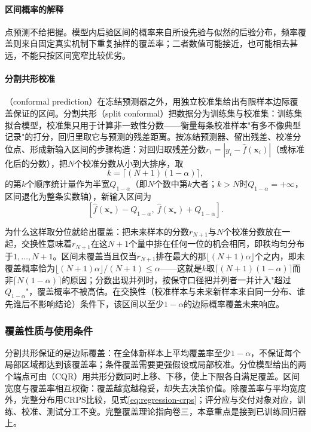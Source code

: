 \paragraph{区间概率的解释}

点预测不给把握。模型内后验区间的概率来自所设先验与似然的后验分布，频率覆盖则来自固定真实机制下重复抽样的覆盖率；二者数值可能接近，也可能相去甚远，不能只按区间宽窄比较优劣。

\paragraph{分割共形校准}

（conformal prediction）在冻结预测器之外，用独立校准集给出有限样本边际覆盖保证的区间。分割共形（split conformal）把数据分为训练集与校准集：训练集拟合模型，校准集只用于计算非一致性分数——衡量每条校准样本"有多不像典型记录"的打分，回归里取它与预测的残差距离。按冻结预测器、留出残差、校准分位点、形成新输入区间的步骤构造：对回归取残差分数$r_i=|y_i-\widehat f(\bm{x}_i)|$（或标准化后的分数），把$N$个校准分数从小到大排序，取
\begin{equation}
  k=\lceil (N+1)(1-\alpha)\rceil,
  \label{eq:regression-conformal-k}
\end{equation}
的第$k$个顺序统计量作为半宽$Q_{1-\alpha}$（即$N$个数中第$k$大者；$k>N$时$Q_{1-\alpha}=+\infty$，区间退化为整条实数轴），新输入区间为
\[
  [\widehat f(\bm{x}_\star)-Q_{1-\alpha},\ \widehat f(\bm{x}_\star)+Q_{1-\alpha}].
\]

为什么这样取分位就给出覆盖：把未来样本的分数$r_{N+1}$与$N$个校准分数放在一起，交换性意味着$r_{N+1}$在这$N+1$个量中排在任何一位的机会相同，即秩均匀分布于$1,\ldots,N+1$。区间未覆盖当且仅当$r_{N+1}$排在最大的那$\lfloor(N+1)\alpha\rfloor$个之内，即未覆盖概率恰为$\lfloor(N+1)\alpha\rfloor/(N+1)\le\alpha$——这就是$k$取$\lceil(N+1)(1-\alpha)\rceil$而非$\lceil N(1-\alpha)\rceil$的原因；分数出现并列时，按保守口径把并列者一并计入"超过$Q_{1-\alpha}$"，覆盖概率不被高估。在交换性（校准样本与未来新样本来自同一分布、谁先谁后不影响结论）条件下，该区间以至少$1-\alpha$的边际概率覆盖未来响应。

\subsubsection{覆盖性质与使用条件}
\label{sec:regression-coverage}

分割共形保证的是边际覆盖：在全体新样本上平均覆盖率至少$1-\alpha$，不保证每个局部区域都达到该覆盖率；条件覆盖需要更强假设或局部校准。分位模型给出的两个端点可由（CQR）用共形分数同时上移、下移，使上下限各自满足覆盖。区间宽度与覆盖率相互权衡：覆盖越宽越稳妥，却失去决策价值。除覆盖率与平均宽度外，完整分布用CRPS比较，见式\eqref{eq:regression-crps}；评分应与交付对象对应，训练、校准、测试分工不变。完整覆盖理论指向卷三，本章重点是接到已训练回归器上。
